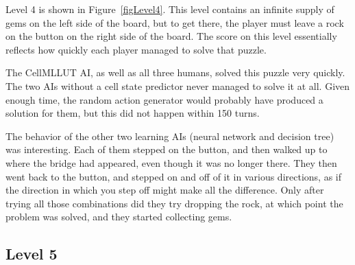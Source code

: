 \documentclass{article}
\begin{document}
Level 4 is shown in Figure~\ref{figLevel4}.  This level contains an infinite supply of gems on the left side of the board, but to get there, the player must leave a rock on the button on the right side of the board.  The score on this level essentially reflects how quickly each player managed to solve that puzzle.

The CellMLLUT AI, as well as all three humans, solved this puzzle very quickly.  The two AIs without a cell state predictor never managed to solve it at all.  Given enough time, the random action generator would probably have produced a solution for them, but this did not happen within 150 turns.

The behavior of the other two learning AIs (neural network and decision tree) was interesting.  Each of them stepped on the button, and then walked up to where the bridge had appeared, even though it was no longer there.  They then went back to the button, and stepped on and off of it in various directions, as if the direction in which you step off might make all the difference.  Only after trying all those combinations did they try dropping the rock, at which point the problem was solved, and they started collecting gems.

\subsection{Level 5}
\end{document}
